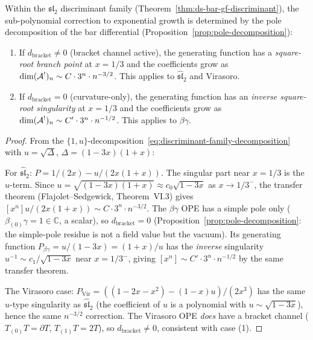 \begin{proposition}
\label{prop:pole-singularity-type}
Within the $\mathfrak{sl}_2$ discriminant family
(Theorem~\textup{\ref{thm:ds-bar-gf-discriminant}}), the sub-polynomial
correction to exponential growth is determined by the pole decomposition
of the bar differential
(Proposition~\textup{\ref{prop:pole-decomposition}}):
\begin{enumerate}
\item If $d_{\mathrm{bracket}} \neq 0$ (bracket channel active),
  the generating function has a \emph{square-root branch point}
  at $x = 1/3$ and the coefficients grow as
  $\dim (\mathcal{A}^!)_n \sim C \cdot 3^n \cdot n^{-3/2}$.
  This applies to $\widehat{\mathfrak{sl}}_2$ and Virasoro.
\item If $d_{\mathrm{bracket}} = 0$ (curvature-only), the generating function
  has an \emph{inverse square-root singularity} at $x = 1/3$ and
  the coefficients grow as
  $\dim (\mathcal{A}^!)_n \sim C' \cdot 3^n \cdot n^{-1/2}$.
  This applies to $\beta\gamma$.
\end{enumerate}
\end{proposition}

\begin{proof}
From the $\{1, u\}$-decomposition~\eqref{eq:discriminant-family-decomposition}
with $u = \sqrt{\Delta}$, $\Delta = (1{-}3x)(1{+}x)$:

For $\widehat{\mathfrak{sl}}_2$: $P = 1/(2x) - u/(2x(1{+}x))$.
The singular part near $x = 1/3$ is the $u$-term.  Since
$u = \sqrt{(1{-}3x)(1{+}x)} \approx c_0\sqrt{1{-}3x}$ as $x \to 1/3^-$,
the transfer theorem (Flajolet--Sedgewick, Theorem~VI.3) gives
$[x^n] u/(2x(1{+}x)) \sim C \cdot 3^n \cdot n^{-3/2}$.
The $\beta\gamma$ OPE has a simple pole only
($\beta_{(0)}\gamma = 1 \in \mathbb{C}$, a scalar),
so $d_{\mathrm{bracket}} = 0$
(Proposition~\ref{prop:pole-decomposition}: the simple-pole residue is
not a field value but the vacuum).
Its generating function $P_{\beta\gamma} = u/(1{-}3x) = (1{+}x)/u$
has the \emph{inverse} singularity $u^{-1} \sim c_1 / \sqrt{1{-}3x}$
near $x = 1/3^-$, giving $[x^n] \sim C' \cdot 3^n \cdot n^{-1/2}$
by the same transfer theorem.

The Virasoro case: $P_{\mathrm{Vir}} = ((1{-}2x{-}x^2) - (1{-}x)u)/(2x^3)$
has the same $u$-type singularity as $\widehat{\mathfrak{sl}}_2$
(the coefficient of $u$ is a polynomial with $u \sim \sqrt{1{-}3x}$),
hence the same $n^{-3/2}$ correction.
The Virasoro OPE \emph{does} have a bracket channel
($T_{(0)}T = \partial T$, $T_{(1)}T = 2T$),
so $d_{\mathrm{bracket}} \neq 0$, consistent with case (1).
\end{proof}

